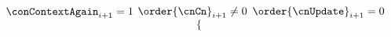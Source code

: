 \begin{description}
		\If $\conContextAgain_{i + 1} = 1$ \et $\order{\cnCn}_{i + 1} \neq 0$ \et $\order{\cnUpdate}_{i + 1} = 0$ \Then
		\[
			\left\{ \begin{array}{lcl}

\end{array}\]
\end{description}
